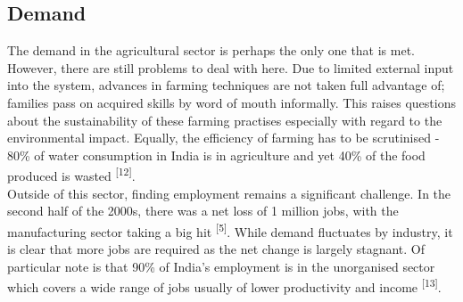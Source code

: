\documentclass[a4paper, 10pt]{article}
\begin{document}
\subsection*{Demand}
The demand in the agricultural sector is perhaps the only one that is met. However, there are still problems to deal with here. Due to limited external input into the system, advances in farming techniques are not taken full advantage of; families pass on acquired skills by word of mouth informally. This raises questions about the sustainability of these farming practises especially with regard to the environmental impact. Equally, the efficiency of farming has to be scrutinised - 80\% of water consumption in India is in agriculture and yet 40\% of the food produced is wasted \textsuperscript{[12]}. \\

\noindent Outside of this sector, finding employment remains a significant challenge. In the second half of the 2000s, there was a net loss of 1 million jobs, with the manufacturing sector taking a big hit \textsuperscript{[5]}. While demand fluctuates by industry, it is clear that more jobs are required as the net change is largely stagnant. Of particular note is that 90\% of India's employment is in the unorganised sector which covers a wide range of jobs usually of lower productivity and income \textsuperscript{[13]}. \\
\end{document}
